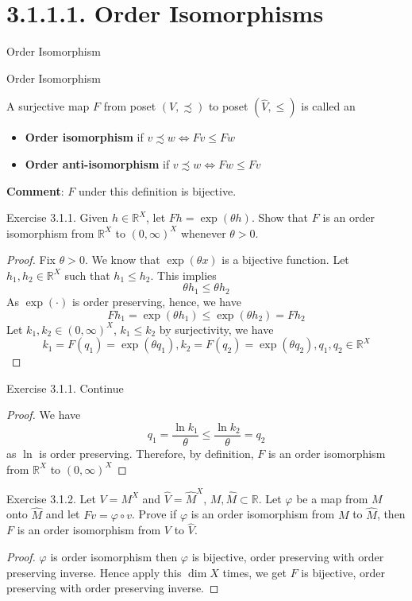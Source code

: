 \section{3.1.1.1. Order Isomorphisms}
\begin{frame}{Order Isomorphism}
    
\end{frame}
\begin{frame}{Order Isomorphism}
\begin{definition}
    A surjective map $F$ from poset $(V,\precsim)$ to poset $(\hat V, \le)$ is called an 
    \begin{itemize}
        \item \textbf{Order isomorphism} if $v\precsim w\iff Fv\le Fw$
        \item \textbf{Order anti-isomorphism} if $v\precsim w \iff Fw\le Fv$
    \end{itemize}
\end{definition}
\textbf{Comment}: $F$ under this definition is bijective.
\end{frame}

\begin{frame}{Exercise 3.1.1.}
Given $h\in\mathbb{R}^X$, let $Fh = \exp(\theta h)$. Show that $F$ is an order isomorphism from $\mathbb{R}^X$ to $(0,\infty)^X$ whenever $\theta >0$.
\begin{proof}
    Fix $\theta>0$. We know that $\exp(\theta x)$ is a bijective function. 
    Let $h_1,h_2\in \mathbb{R}^X$ such that $h_1\le h_2$. This implies
    $$
    \theta h_1\le \theta h_2
    $$
    As $\exp(\cdot)$ is order preserving, hence, we have
    $$
    Fh_1  = \exp(\theta h_1) \le \exp(\theta h_2) = Fh_2
    $$
    Let $k_1, k_2\in (0,\infty)^X$, $k_1\le k_2$ by surjectivity, we have 
    $$
    k_1 = F(q_1) = \exp(\theta q_1), k_2 = F(q_2) = \exp(\theta q_2), q_1,q_2\in \mathbb{R}^X
    $$
\end{proof}
\end{frame}

\begin{frame}{Exercise 3.1.1. Continue}
\begin{proof}
    We have 
    $$
    q_1 = \frac{\ln k_1}{\theta}\le \frac{\ln k_2}{\theta} = q_2
    $$
    as $\ln$ is order preserving.
    Therefore, by definition, $F$ is an order isomorphism from $\mathbb{R}^X$ to $(0,\infty)^X$
\end{proof}    
\end{frame}

\begin{frame}{Exercise 3.1.2.}
Let $V= M^X$ and $\hat V = \hat M^X$, $M,\hat M\subset \mathbb{R}$. Let $\varphi$ be a map from $M$ onto $\hat M$ and let $Fv = \varphi\circ v$. Prove if $\varphi$ is an order isomorphism from $M$ to $\hat M$, then $F$ is an order isomorphism from $V$ to $\hat V$.
\begin{proof}
    $\varphi$ is order isomorphism then $\varphi$ is bijective, order preserving with order preserving inverse.
    Hence apply this $\dim X$ times, we get $F$ is bijective,  order preserving with order preserving inverse.
\end{proof}
    
\end{frame}

